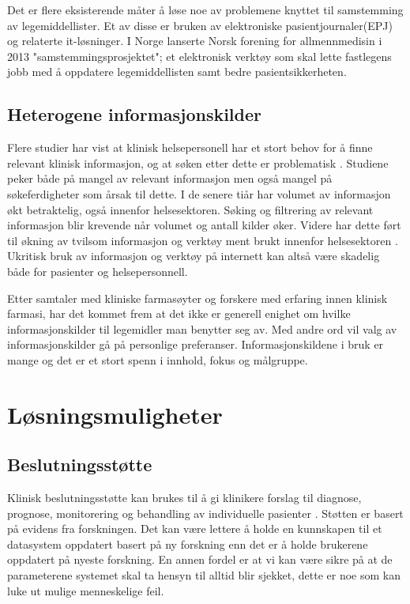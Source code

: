 Det er flere eksisterende måter å løse noe av problemene knyttet til samstemming av legemiddellister. Et av disse er bruken av elektroniske pasientjournaler(EPJ) og relaterte it-løsninger\citep{med_rec_problem}. I Norge lanserte Norsk forening for allmennmedisin i 2013 "samstemmingsprosjektet"; et elektronisk verktøy som skal lette fastlegens jobb med å oppdatere legemiddellisten samt bedre pasientsikkerheten\citep{samstemming_tidsskriftet}.

\subsection{Heterogene informasjonskilder}
Flere studier har vist at klinisk helsepersonell har et stort behov for å finne relevant klinisk informasjon, og at søken etter dette er problematisk \citep{Information_Needs_Information_Seeking_PHC}\citep{Information_Needs_Being_Met}\citep{IR_Patterns_Surgeons}. Studiene peker både på mangel av relevant informasjon men også mangel på søkeferdigheter som årsak til dette. I de senere tiår har volumet av informasjon økt betraktelig, også innenfor helsesektoren. Søking og filtrering av relevant informasjon blir krevende når volumet og antall kilder øker. Videre har dette ført til økning av tvilsom informasjon og verktøy ment brukt innenfor helsesektoren \citep{Rating_Health_Information}. Ukritisk bruk av informasjon og verktøy på internett kan altså være skadelig både for pasienter og helsepersonnell. 

Etter samtaler med kliniske farmasøyter og forskere med erfaring innen klinisk farmasi, har det kommet frem at det ikke er generell enighet om hvilke informasjonskilder til legemidler man benytter seg av. Med andre ord vil valg av informasjonskilder gå på personlige preferanser. Informasjonskildene i bruk er mange og det er et stort spenn i innhold, fokus og målgruppe. 

\section{Løsningsmuligheter}
\subsection{Beslutningsstøtte}
Klinisk beslutningsstøtte kan brukes til å gi klinikere forslag til diagnose, prognose, monitorering og behandling av individuelle pasienter \citep{european_commission}. Støtten er basert på evidens fra forskningen. Det kan være lettere å holde en kunnskapen til et datasystem oppdatert basert på ny forskning enn det er å holde brukerene oppdatert på nyeste forskning. En annen fordel er at vi kan være sikre på at de parameterene systemet skal ta hensyn til alltid blir sjekket, dette er noe som kan luke ut mulige menneskelige feil.

